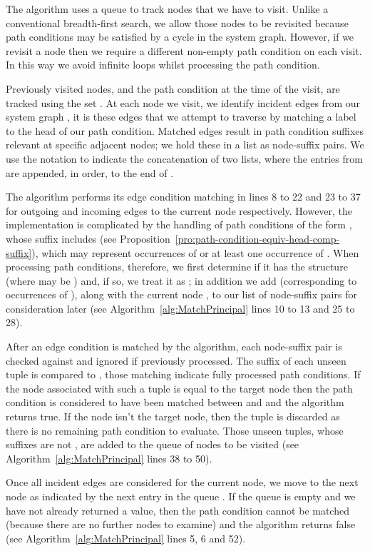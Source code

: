 \documentclass{article}
\begin{document}
The algorithm uses a queue  to track nodes that we have to visit.
Unlike a conventional breadth-first search, we allow those nodes to be revisited because path conditions may be satisfied by a cycle in the system graph.
However, if we revisit a node then we require a different non-empty path condition on each visit.
In this way we avoid infinite loops whilst processing the path condition.

Previously visited nodes, and the path condition at the time of the visit, are tracked using the set .
At each node  we visit, we identify incident edges from our system graph , it is these edges that we attempt to traverse by matching a label to the head of our path condition.
Matched edges result in path condition suffixes relevant at specific adjacent nodes; we hold these in a list as node-suffix pairs. We use the notation  to indicate the concatenation of two lists, where the entries from  are appended, in order, to the end of .

The algorithm performs its edge condition matching in lines 8 to 22 and 23 to 37 for outgoing and incoming edges to the current node  respectively.
However, the implementation is complicated by the handling of path conditions of the form , whose suffix includes  (see Proposition~\ref{pro:path-condition-equiv-head-comp-suffix}), which may represent  occurrences of  or at least one occurrence of .
When processing path conditions, therefore, we first determine if it has the structure  (where  may be ) and, if so, we treat it as ; in addition we add  (corresponding to  occurrences of ), along with the current node , to our list of node-suffix pairs for consideration later (see Algorithm~\ref{alg:MatchPrincipal} lines 10 to 13 and 25 to 28).

After an edge condition is matched by the algorithm, each node-suffix pair is checked against  and ignored if previously processed. The suffix  of each unseen tuple is compared to , those matching indicate fully processed path conditions. If the node  associated with such a tuple is equal to the target node  then the path condition is considered to have been matched between  and  and the algorithm returns true. If the node isn't the target node, then the tuple is discarded as there is no remaining path condition to evaluate. Those unseen tuples, whose suffixes are not , are added to the queue of nodes to be visited (see Algorithm~\ref{alg:MatchPrincipal} lines 38 to 50).

Once all incident edges are considered for the current node, we move to the next node as indicated by the next entry in the queue . If the queue is empty and we have not already returned a value, then the path condition cannot be matched (because there are no further nodes to examine) and the algorithm returns false (see Algorithm~\ref{alg:MatchPrincipal} lines 5, 6 and 52).
\end{document}
